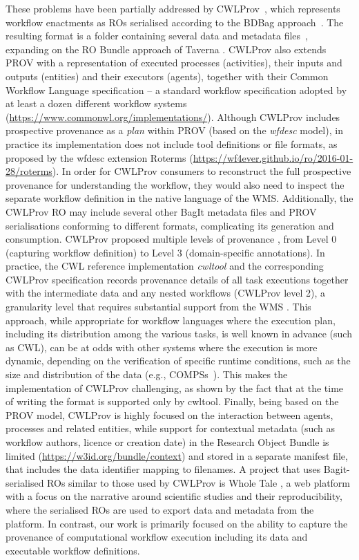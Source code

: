 \documentclass[10pt,letterpaper]{article}
\begin{document}
These problems have been partially addressed by CWLProv~\cite{Khan 2019}, which represents workflow enactments as ROs serialised according to the BDBag approach~\cite{Chard 2016}.
The resulting format is a folder containing several data and metadata files~\cite{Soiland-Reyes 2018}, expanding on the RO Bundle approach of Taverna \cite{Soiland-Reyes 2016}.
CWLProv also extends PROV with a representation of executed processes (activities), their inputs and outputs (entities) and their executors (agents), together with their Common Workflow Language specification
\cite{Crusoe 2022} -- a standard workflow specification adopted by at least a dozen different workflow systems (\url{https://www.commonwl.org/implementations/}). Although CWLProv includes prospective provenance as a \emph{plan}
within PROV (based on the \emph{wfdesc} model), in practice its implementation does not include tool definitions or file formats, as proposed by the wfdesc extension Roterms (\url{https://wf4ever.github.io/ro/2016-01-28/roterms}).
In order for CWLProv consumers to reconstruct the full prospective provenance for understanding the workflow, they would also need to inspect the separate workflow definition in the native language of the WMS.
Additionally, the CWLProv RO may include several other BagIt metadata files and PROV serialisations conforming to different formats, complicating its generation and consumption.
CWLProv proposed multiple levels of provenance \cite[figure 2]{Khan 2019}, from Level 0 (capturing workflow definition) to Level 3 (domain-specific annotations). 
In practice, the CWL reference implementation \emph{cwltool} \cite{Amstutz 2023} and the corresponding CWLProv specification \cite{Soiland-Reyes 2018} records provenance details of all task executions together with the intermediate data and any nested workflows (CWLProv level 2), a granularity level that requires substantial support from the WMS
\cite{Soiland-Reyes 2022a}.
This approach, while appropriate for workflow languages where the execution plan, including its distribution among the various tasks, is well known in advance (such as CWL), can be at odds with other systems where the execution is more dynamic, depending on the verification of specific runtime conditions, such as the size and distribution of the data (e.g., COMPSs~\cite{Lordan 2014}).
This makes the implementation of CWLProv challenging, as shown by the fact that at the time of writing the format is supported only by cwltool.
Finally, being based on the PROV model, CWLProv is highly focused on the interaction between agents, processes and related entities, while support for contextual metadata (such as workflow authors, licence or creation date) in the Research Object Bundle is limited (\url{https://w3id.org/bundle/context}) and stored in a separate manifest file, that includes the data identifier mapping to filenames.
A project that uses Bagit-serialised ROs similar to those used by CWLProv is Whole Tale \cite{Chard 2019}, a web platform with a focus on the narrative around scientific studies and their reproducibility, where the serialised ROs are used to export data and metadata from the platform. In contrast, our work is primarily focused on the ability to capture the provenance of computational workflow execution including its data and executable workflow definitions.
\end{document}

